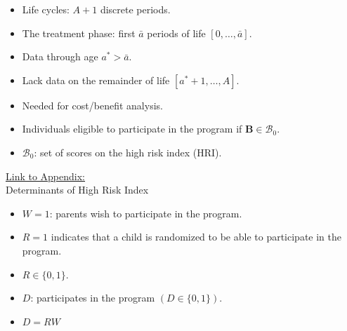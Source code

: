 \documentclass[static]{JJH-Beamer}
\begin{document}

\begin{itemize}
\item Life cycles: $A+1$ discrete periods.
\item The treatment phase: first $\bar{a}$ periods of life $\left[0,\dots,\bar{a}\right]$.
\item Data through age $a^{*} > \bar{a}$.
\item Lack data on the remainder of life $[a^* + 1,\dots,A]$.
\item Needed for cost/benefit analysis.
\end{itemize}

\begin{frame}

\begin{itemize}
\item Individuals eligible to participate in the program if $\bm{B}\in\mathcal{B}_0$.
\item $\mathcal{B}_0$: set of scores on the high risk index (HRI).
\end{itemize}

\end{frame}

\begin{frame}

\hypertarget{ret:chocohocochip}{}
\begin{center}
\hyperlink{chocohocochip}{\underline{Link to Appendix:}}\\
Determinants of High Risk Index
\end{center}

\end{frame}

\begin{frame}

\begin{itemize}
\item $W=1$: parents wish to participate in the program.
\item $R=1$ indicates that a child is randomized to be able to participate in the program.
\item $R \in \{0,1\}$.
\item $D$: participates in the program $(D \in \{ 0,1 \})$.
\item $D=RW$
\end{itemize}

\end{frame}
\end{document}
